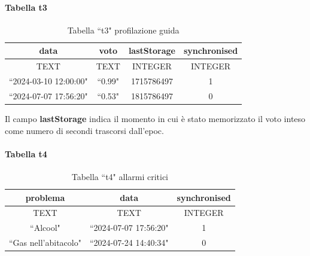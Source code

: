\documentclass[12pt, a4paper, italian]{report}
\numberwithin{figure}{chapter}
\numberwithin{table}{chapter}
\begin{document}
\paragraph{Tabella t3}
\begin{table}[h!]
  \centering 
  \begin{adjustbox}{max width=\textwidth}
    \begin{tabular}{|c|c|c|c|}
      \hline
      \textbf{data} & \textbf{voto} & \textbf{lastStorage} & \textbf{synchronised} \\
      \hline
      TEXT & TEXT & INTEGER & INTEGER \\
      \hline
      ``2024-03-10 12:00:00" & ``0.99" & 1715786497 & 1 \\
      \hline
      ``2024-07-07 17:56:20" & ``0.53" & 1815786497 & 0 \\
      \hline
    \end{tabular}
  \end{adjustbox}
  \caption{Tabella ``t3" profilazione guida}
  \label{tab:t3 profilazione}
\end{table}
Il campo \textbf{lastStorage} indica il momento in cui è stato memorizzato il voto inteso come numero di secondi trascorsi dall'epoc.

\paragraph{Tabella t4}
\begin{table}[h!]
  \centering 
  \begin{adjustbox}{max width=\textwidth}
    \begin{tabular}{|c|c|c|}
      \hline
      \textbf{problema} & \textbf{data} & \textbf{synchronised} \\
      \hline
      TEXT & TEXT & INTEGER \\
      \hline
      ``Alcool" & ``2024-07-07 17:56:20" & 1 \\
      \hline
      ``Gas nell'abitacolo" & ``2024-07-24 14:40:34" & 0   \\
      \hline
    \end{tabular}
  \end{adjustbox}
  \caption{Tabella ``t4" allarmi critici}
  \label{tab:t4 allarmi critici}
\end{table}
\end{document}
